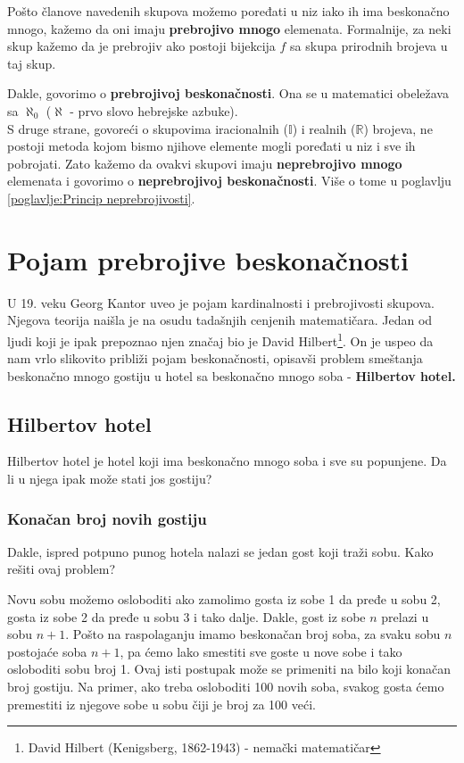 \documentclass[a4paper]{article}
\begin{document}
Pošto članove navedenih skupova možemo poređati u niz iako ih ima beskonačno mnogo, kažemo da oni imaju \textbf{prebrojivo mnogo} elemenata. Formalnije, za neki skup kažemo da je prebrojiv ako postoji bijekcija $f$ sa skupa prirodnih brojeva u taj skup\cite{klaric2016}.

Dakle, govorimo o \textbf{prebrojivoj beskonačnosti}. Ona se u matematici obeležava sa $\aleph_{0}$ ($\aleph$ - prvo slovo hebrejske azbuke).\\

S druge strane, govoreći o skupovima iracionalnih ($\mathbb{I}$) i realnih ($\mathbb{R}$) brojeva, ne postoji metoda kojom bismo njihove elemente mogli poređati u niz i sve ih pobrojati. Zato kažemo da ovakvi skupovi imaju \textbf{neprebrojivo mnogo} elemenata i govorimo o \textbf{neprebrojivoj beskonačnosti}. Više o tome u poglavlju \ref{poglavlje:Princip neprebrojivosti}.


\newpage

\section{Pojam prebrojive beskonačnosti}
\label{poglavlje:Pojam prebrojive beskonačnosti}
U 19. veku Georg Kantor uveo je pojam kardinalnosti i prebrojivosti skupova. Njegova teorija naišla je na osudu tadašnjih cenjenih matematičara.
Jedan od ljudi koji je ipak prepoznao njen značaj bio je David Hilbert\footnote{David Hilbert (Kenigsberg, 1862-1943) - nemački matematičar}.
On je uspeo da nam vrlo slikovito približi pojam beskonačnosti, opisavši problem smeštanja beskonačno mnogo gostiju u hotel sa beskonačno mnogo soba - \textbf{Hilbertov hotel.}

\subsection{Hilbertov hotel}
Hilbertov hotel je hotel koji ima beskonačno mnogo soba i sve su popunjene. Da li u njega ipak može stati jos gostiju?

\subsubsection{Konačan broj novih gostiju}
\label{potpotpoglavlje:Konačan broj novih gostiju}
Dakle, ispred potpuno punog hotela nalazi se jedan gost koji traži sobu. Kako rešiti ovaj problem?

Novu sobu možemo osloboditi ako zamolimo gosta iz sobe 1 da pređe u sobu 2, gosta iz sobe 2 da pređe u sobu 3 i tako dalje. Dakle, gost iz sobe $n$ prelazi u sobu $n+1$.
Pošto na raspolaganju imamo beskonačan broj soba, za svaku sobu $n$ postojaće soba $n+1$, pa ćemo lako smestiti sve goste u nove sobe i tako osloboditi sobu broj 1.
Ovaj isti postupak može se primeniti na bilo koji konačan broj gostiju. Na primer, ako treba osloboditi 100 novih soba, svakog gosta ćemo premestiti iz njegove sobe u sobu čiji je broj za 100 veći.
\end{document}
